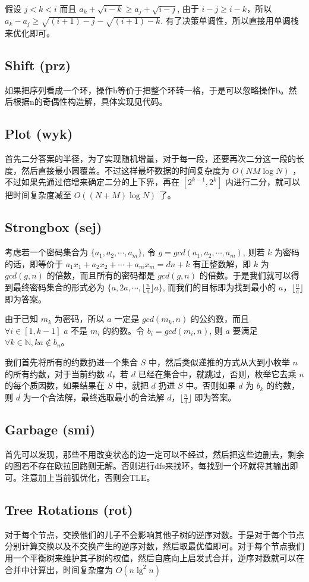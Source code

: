 \documentclass[a4paper,11pt]{article}
\begin{document}
假设 $j < k < i$ 而且 $a_k + \sqrt{i - k} \ge a_j + \sqrt{i - j}$, 由于 $i - j \ge i - k$，所以 $a_k - a_j \ge \sqrt{(i + 1) - j} - \sqrt{(i + 1) - k}$. 有了决策单调性，所以直接用单调栈来优化即可。
\subsection*{Shift (prz)}
如果把序列看成一个环，操作b等价于把整个环转一格，于是可以忽略操作b。然后根据n的奇偶性构造解，具体实现见代码。
\subsection*{Plot (wyk)}
首先二分答案的半径，为了实现随机增量，对于每一段，还要再次二分这一段的长度，然后直接最小圆覆盖。不过这样最坏数据的时间复杂度为 $O(NM\log N)$ ，不过如果先通过倍增来确定二分的上下界，再在 $[2^{k-1},2^k]$ 内进行二分，就可以把时间复杂度减至 $O((N+M)\log N)$ 了。
\subsection*{Strongbox (sej)}
考虑若一个密码集合为 $\{a_1, a_2, \cdots, a_m\}$, 令 $g = gcd(a_1, a_2, \cdots, a_m)$, 则若 $k$ 为密码的话，即等价于 $a_1x_1 + a_2x_2 + \cdots + a_mx_m = dn+k$ 有正整数解，即 $k$ 为 $gcd(g, n)$ 的倍数，而且所有的密码都是 $gcd(g, n)$ 的倍数。于是我们就可以得到最终密码集合的形式必为 $\{a, 2a, \cdots, \lfloor\frac{n}{a}\rfloor a\}$, 而我们的目标即为找到最小的 $a$，$\lfloor\frac{n}{a}\rfloor$ 即为答案。

由于已知 $m_k$ 为密码，所以 $a$ 一定是 $gcd(m_k, n)$ 的公约数，而且 $\forall i \in [1, k-1]$ $a$ 不是 $m_i$ 的约数。令 $b_i = gcd(m_i, n)$, 则 $a$ 要满足 $\forall k \in \mathbb{N}, ka \not\in {b_n}$。

我们首先将所有的约数扔进一个集合 $S$ 中，然后类似递推的方式从大到小枚举 $n$ 的所有约数，对于当前约数 $d$，若 $d$ 已经在集合中，就跳过，否则，枚举它去乘 $n$ 的每个质因数，如果结果在 $S$ 中，就把 $d$ 扔进 $S$ 中。否则如果 $d$ 为 $b_k$ 的约数，则 $d$ 为一个合法解，最终选取最小的合法解 $d$，$\lfloor\frac{n}{d}\rfloor$ 即为答案。
\subsection*{Garbage (smi)}
首先可以发现，那些不用改变状态的边一定可以不经过，然后把这些边删去，剩余的图若不存在欧拉回路则无解。否则进行dfs来找环，每找到一个环就将其输出即可。注意加上当前弧优化，否则会TLE。
\subsection*{Tree Rotations (rot)}
对于每个节点，交换他们的儿子不会影响其他子树的逆序对数。于是对于每个节点分别计算交换以及不交换产生的逆序对数，然后取最优值即可。对于每个节点我们用一个平衡树来维护其子树的权值，然后自底向上启发式合并，逆序对数就可以在合并中计算出，时间复杂度为 $O(n\lg^2n)$
\end{document}
